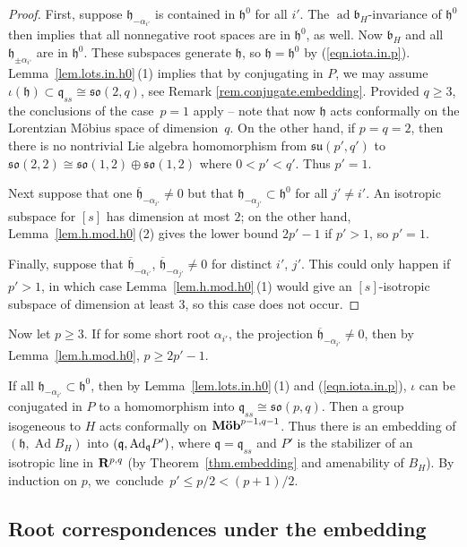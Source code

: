 \documentclass[pdftex]{sigma}
\numberwithin{equation}{section}
\theoremstyle{definition}
\newcommand{\BR}{{\bf R}}
\newcommand{\lieh}{\mathfrak{h}}
\def\q{{\mathfrak q}}
\def\b{{\mathfrak b}}
\newcommand{\so}{\mathfrak{so}}
\newcommand{\Ad}{\operatorname{Ad}}
\newcommand{\ad}{\operatorname{ad}}
\begin{document}
\begin{proof}
First, suppose $\lieh_{- \alpha_{i'}}$ is contained in $\lieh^0$ for all $i'$. The $\ad \b_H$-invariance of $\lieh^0$ then implies that all nonnegative root spaces are in $\lieh^0$, as well. Now $\b_H$ and all $\lieh_{\pm \alpha_{i'}}$ are in $\lieh^0$. These subspaces generate $\lieh$, so $\lieh = \lieh^0$ by (\ref{eqn.iota.in.p}). Lemma~\ref{lem.lots.in.h0}\,(1) implies that by conjugating in $P$, we may assume $\iota(\lieh) \subset \q_{ss} \cong \so(2,q)$, see Remark \ref{rem.conjugate.embedding}. Provided $q \geq 3$, the conclusions of the case~${p=1}$ apply -- note that now $\lieh$ acts conformally on the Lorentzian M\"obius space of dimension~$q$. On the other hand, if $p=q=2$, then there is no nontrivial Lie algebra homomorphism from $\mathfrak{su}(p',q')$ to $\so(2,2) \cong \so(1,2) \oplus \so(1,2)$ where $0 < p' < q'$.
Thus $p'=1$.

Next suppose that one $\overline{\lieh}_{- \alpha_{i'}} \neq 0$ but that $\lieh_{- \alpha_{j'}} \subset \lieh^0$ for all $j' \neq i'$. An isotropic subspace for $[s]$ has dimension at most $2$; on the other hand, Lemma~\ref{lem.h.mod.h0}\,(2) gives the lower bound $2p'-1$ if $p' >1$, so $p'=1$.

Finally, suppose that $\overline{\lieh}_{- \alpha_{i'}}$, $\overline{\lieh}_{- \alpha_{j'}} \neq 0$ for distinct $i'$, $j'$. This could only happen if $p'>1$, in which case Lemma~\ref{lem.h.mod.h0}\,(1) would give an $[s]$-isotropic subspace of dimension at least $3$, so this case does not occur.
\end{proof}

Now let $p \geq 3$.
If for some short root $\alpha_{i'}$, the projection $\overline{\lieh}_{- \alpha_{i'}} \neq 0$, then by Lemma~\ref{lem.h.mod.h0}, $p \geq 2p'-1$.

If all $\lieh_{- \alpha_{i'}} \subset \lieh^0$, then by Lemma~\ref{lem.lots.in.h0}\,(1) and (\ref{eqn.iota.in.p}), $\iota$ can be conjugated in $P$ to a homomorphism into $\q_{ss} \cong \so(p,q)$. Then a group isogeneous to $H$ acts conformally on $\mbox{\bf M\"ob}^{p-1,q-1}$.
Thus there is an embedding of $(\lieh, \Ad B_H)$ into $(\q, {\rm Ad}_\q P')$, where $\q = \q_{ss}$ and $P'$ is the stabilizer of an isotropic line in $\BR^{p,q}$ (by Theorem~\ref{thm.embedding} and amenability of $B_H$).
By induction on $p$, we~conclude~${p' \leq p/2 < (p+1)/2}$.


\subsection{Root correspondences under the embedding}
\label{subsec.root.correspondences}
\end{document}
